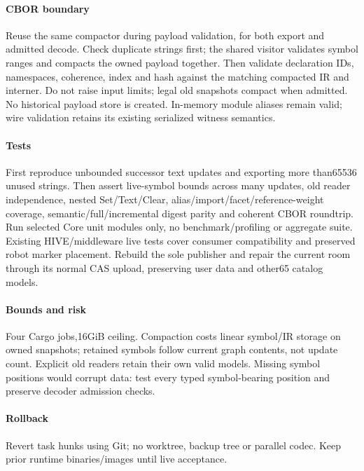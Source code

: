\documentclass{article}
\begin{document}
\paragraph{CBOR boundary} Reuse the same compactor during payload validation,
for both export and admitted decode. Check duplicate strings first; the shared
visitor validates symbol ranges and compacts the owned payload together. Then
validate declaration IDs, namespaces, coherence, index and hash against the
matching compacted IR and interner. Do not raise
input limits; legal old snapshots compact when admitted. No historical payload
store is created. In-memory module aliases remain valid; wire validation retains
its existing serialized witness semantics.
\paragraph{Tests} First reproduce unbounded successor text updates and exporting
more than65536 unused strings. Then assert live-symbol bounds across many updates,
old reader independence, nested Set/Text/Clear, alias/import/facet/reference-weight
coverage, semantic/full/incremental digest parity and coherent CBOR roundtrip.
Run selected Core unit modules only, no benchmark/profiling or aggregate suite.
Existing HIVE/middleware live tests cover consumer compatibility and preserved
robot marker placement. Rebuild the sole publisher and repair the current room
through its normal CAS upload, preserving user data and other65 catalog models.
\paragraph{Bounds and risk} Four Cargo jobs,16GiB ceiling. Compaction costs linear
symbol/IR storage on owned snapshots; retained symbols follow current graph
contents, not update count. Explicit old readers retain their own valid models.
Missing symbol positions would corrupt data: test every typed symbol-bearing
position and preserve decoder admission checks.
\paragraph{Rollback} Revert task hunks using Git; no worktree, backup tree or
parallel codec. Keep prior runtime binaries/images until live acceptance.

\end{document}
